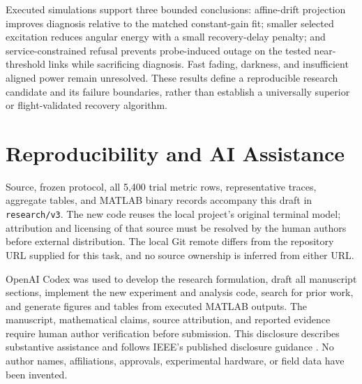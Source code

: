 \documentclass[journal]{IEEEtran}
\begin{document}
Executed simulations support three bounded conclusions: affine-drift projection improves diagnosis relative to the matched constant-gain fit; smaller selected excitation reduces angular energy with a small recovery-delay penalty; and service-constrained refusal prevents probe-induced outage on the tested near-threshold links while sacrificing diagnosis. Fast fading, darkness, and insufficient aligned power remain unresolved. These results define a reproducible research candidate and its failure boundaries, rather than establish a universally superior or flight-validated recovery algorithm.

\section*{Reproducibility and AI Assistance}
Source, frozen protocol, all 5,400 trial metric rows, representative traces, aggregate tables, and MATLAB binary records accompany this draft in \texttt{research/v3}. The new code reuses the local project's original terminal model; attribution and licensing of that source must be resolved by the human authors before external distribution. The local Git remote differs from the repository URL supplied for this task, and no source ownership is inferred from either URL.

OpenAI Codex was used to develop the research formulation, draft all manuscript sections, implement the new experiment and analysis code, search for prior work, and generate figures and tables from executed MATLAB outputs. The manuscript, mathematical claims, source attribution, and reported evidence require human author verification before submission. This disclosure describes substantive assistance and follows IEEE's published disclosure guidance \cite{aipolicy}. No author names, affiliations, approvals, experimental hardware, or field data have been invented.
\end{document}
